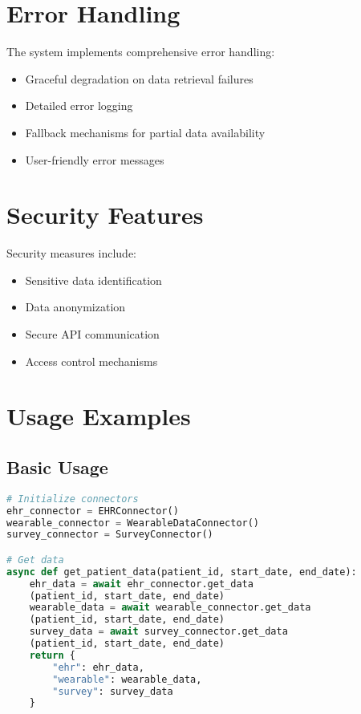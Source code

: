 \documentclass[12pt]{article}
\begin{document}
\section{Error Handling}
The system implements comprehensive error handling:
\begin{itemize}
    \item Graceful degradation on data retrieval failures
    \item Detailed error logging
    \item Fallback mechanisms for partial data availability
    \item User-friendly error messages
\end{itemize}

\section{Security Features}
Security measures include:
\begin{itemize}
    \item Sensitive data identification
    \item Data anonymization
    \item Secure API communication
    \item Access control mechanisms
\end{itemize}

\section{Usage Examples}

\subsection{Basic Usage}
\begin{lstlisting}[language=Python]
# Initialize connectors
ehr_connector = EHRConnector()
wearable_connector = WearableDataConnector()
survey_connector = SurveyConnector()

# Get data
async def get_patient_data(patient_id, start_date, end_date):
    ehr_data = await ehr_connector.get_data
    (patient_id, start_date, end_date)
    wearable_data = await wearable_connector.get_data
    (patient_id, start_date, end_date)
    survey_data = await survey_connector.get_data
    (patient_id, start_date, end_date)
    return {
        "ehr": ehr_data,
        "wearable": wearable_data,
        "survey": survey_data
    }
\end{lstlisting}
\end{document}
